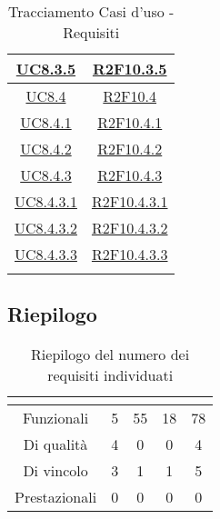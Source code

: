 \begin{longtable}{|c|c|}
	\hline
	\hyperlink{UC8.3.5}{UC8.3.5} & \hyperlink{R2F10.3.5}{R2F10.3.5}\\
	\hline
	\hyperlink{UC8.4}{UC8.4} & \hyperlink{R2F10.4}{R2F10.4}\\
	\hline
	\hyperlink{UC8.4.1}{UC8.4.1} & \hyperlink{R2F10.4.1}{R2F10.4.1}\\
	\hline
	\hyperlink{UC8.4.2}{UC8.4.2} & \hyperlink{R2F10.4.2}{R2F10.4.2}\\
	\hline
	\hyperlink{UC8.4.3}{UC8.4.3} & \hyperlink{R2F10.4.3}{R2F10.4.3}\\
	\hline
	\hyperlink{UC8.4.3.1}{UC8.4.3.1} & \hyperlink{R2F10.4.3.1}{R2F10.4.3.1}\\
	\hline
	\hyperlink{UC8.4.3.2}{UC8.4.3.2} & \hyperlink{R2F10.4.3.2}{R2F10.4.3.2}\\
	\hline
	\hyperlink{UC8.4.3.3}{UC8.4.3.3} & \hyperlink{R2F10.4.3.3}{R2F10.4.3.3}\\
	\hline
	\caption[Tracciamento Casi d'uso - Requisiti]{Tracciamento Casi d'uso - Requisiti}
	\label{tabella:requi-usecase}
\end{longtable}
\renewcommand{\arraystretch}{1}
\clearpage

\subsection{Riepilogo}
\renewcommand{\arraystretch}{1.5}
\begin{table}[H]
	\begin{center}
		\begin{tabular}{|c|c|c|c|c|}
			\hline
			\rowcolor{title_row}
			\textbf{\color{title_text}{Tipologia}}  & \textbf{\color{title_text}{0 Obbligatori}} & \textbf{\color{title_text}{1 Desiderabili}}& \textbf{\color{title_text}{2 Opzionali}} & \textbf{\color{title_text}{Totale}} \\ \hline
			Funzionali & 5 & 55 & 18 & 78\\ \hline
			Di qualità & 4 & 0 & 0 & 4\\ \hline
			Di vincolo & 3 & 1 & 1 & 5\\ \hline
			Prestazionali & 0 & 0 & 0 & 0 \\ \hline
		\end{tabular}
		\caption{Riepilogo del numero dei requisiti individuati\label{}}
	\end{center}
\end{table}
\renewcommand{\arraystretch}{1}





